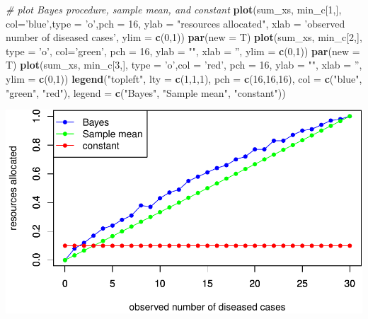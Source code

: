 \documentclass[
]{article}
\newenvironment{Shaded}{\begin{snugshade}}{\end{snugshade}}
\newcommand{\CommentTok}[1]{\textcolor[rgb]{0.56,0.35,0.01}{\textit{#1}}}
\newcommand{\DataTypeTok}[1]{\textcolor[rgb]{0.13,0.29,0.53}{#1}}
\newcommand{\DecValTok}[1]{\textcolor[rgb]{0.00,0.00,0.81}{#1}}
\newcommand{\KeywordTok}[1]{\textcolor[rgb]{0.13,0.29,0.53}{\textbf{#1}}}
\newcommand{\NormalTok}[1]{#1}
\newcommand{\StringTok}[1]{\textcolor[rgb]{0.31,0.60,0.02}{#1}}
\begin{document}
\begin{Shaded}
\begin{Highlighting}[]
\CommentTok{# plot Bayes procedure, sample mean, and constant }
\KeywordTok{plot}\NormalTok{(sum_xs, min_c[}\DecValTok{1}\NormalTok{,], }\DataTypeTok{col=}\StringTok{'blue'}\NormalTok{,}\DataTypeTok{type =} \StringTok{'o'}\NormalTok{,}\DataTypeTok{pch =} \DecValTok{16}\NormalTok{, }
     \DataTypeTok{ylab =} \StringTok{"resources allocated"}\NormalTok{, }\DataTypeTok{xlab =} \StringTok{'observed number of diseased cases'}\NormalTok{,}
     \DataTypeTok{ylim =} \KeywordTok{c}\NormalTok{(}\DecValTok{0}\NormalTok{,}\DecValTok{1}\NormalTok{))}
\KeywordTok{par}\NormalTok{(}\DataTypeTok{new =}\NormalTok{ T)}
\KeywordTok{plot}\NormalTok{(sum_xs, min_c[}\DecValTok{2}\NormalTok{,], }\DataTypeTok{type =} \StringTok{'o'}\NormalTok{, }\DataTypeTok{col=}\StringTok{'green'}\NormalTok{, }
     \DataTypeTok{pch =} \DecValTok{16}\NormalTok{, }\DataTypeTok{ylab =} \StringTok{""}\NormalTok{, }\DataTypeTok{xlab =} \StringTok{''}\NormalTok{, }\DataTypeTok{ylim =} \KeywordTok{c}\NormalTok{(}\DecValTok{0}\NormalTok{,}\DecValTok{1}\NormalTok{))}
\KeywordTok{par}\NormalTok{(}\DataTypeTok{new =}\NormalTok{ T)}
\KeywordTok{plot}\NormalTok{(sum_xs, min_c[}\DecValTok{3}\NormalTok{,], }\DataTypeTok{type =} \StringTok{'o'}\NormalTok{,}\DataTypeTok{col =} \StringTok{'red'}\NormalTok{,}
     \DataTypeTok{pch =} \DecValTok{16}\NormalTok{, }\DataTypeTok{ylab =} \StringTok{""}\NormalTok{, }\DataTypeTok{xlab =} \StringTok{''}\NormalTok{, }\DataTypeTok{ylim =} \KeywordTok{c}\NormalTok{(}\DecValTok{0}\NormalTok{,}\DecValTok{1}\NormalTok{))}
\KeywordTok{legend}\NormalTok{(}\StringTok{"topleft"}\NormalTok{, }\DataTypeTok{lty =} \KeywordTok{c}\NormalTok{(}\DecValTok{1}\NormalTok{,}\DecValTok{1}\NormalTok{,}\DecValTok{1}\NormalTok{), }\DataTypeTok{pch =} \KeywordTok{c}\NormalTok{(}\DecValTok{16}\NormalTok{,}\DecValTok{16}\NormalTok{,}\DecValTok{16}\NormalTok{),}
       \DataTypeTok{col =} \KeywordTok{c}\NormalTok{(}\StringTok{"blue"}\NormalTok{, }\StringTok{"green"}\NormalTok{, }\StringTok{"red"}\NormalTok{),}
       \DataTypeTok{legend =} \KeywordTok{c}\NormalTok{(}\StringTok{"Bayes"}\NormalTok{, }\StringTok{"Sample mean"}\NormalTok{, }\StringTok{"constant"}\NormalTok{))}
\end{Highlighting}
\end{Shaded}

\includegraphics{lab-03_files/figure-latex/unnamed-chunk-6-1.pdf}
\end{document}
